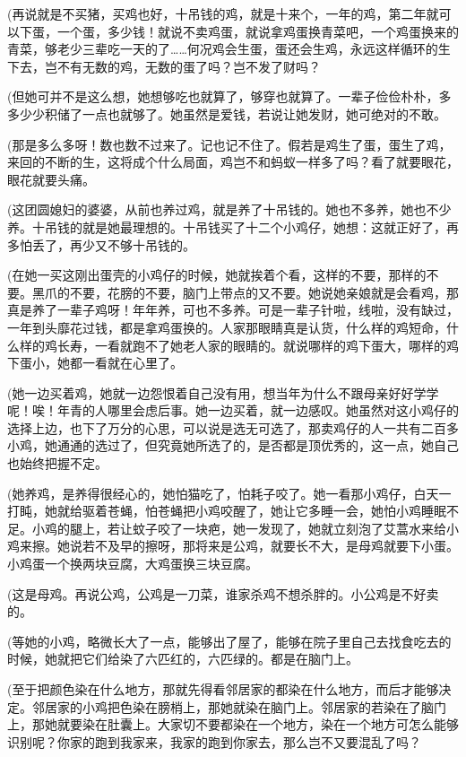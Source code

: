 \par (再说就是不买猪，买鸡也好，十吊钱的鸡，就是十来个，一年的鸡，第二年就可以下蛋，一个蛋，多少钱！就说不卖鸡蛋，就说拿鸡蛋换青菜吧，一个鸡蛋换来的青菜，够老少三辈吃一天的了……何况鸡会生蛋，蛋还会生鸡，永远这样循环的生下去，岂不有无数的鸡，无数的蛋了吗？岂不发了财吗？
\par (但她可并不是这么想，她想够吃也就算了，够穿也就算了。一辈子俭俭朴朴，多多少少积储了一点也就够了。她虽然是爱钱，若说让她发财，她可绝对的不敢。
\par (那是多么多呀！数也数不过来了。记也记不住了。假若是鸡生了蛋，蛋生了鸡，来回的不断的生，这将成个什么局面，鸡岂不和蚂蚁一样多了吗？看了就要眼花，眼花就要头痛。
\par (这团圆媳妇的婆婆，从前也养过鸡，就是养了十吊钱的。她也不多养，她也不少养。十吊钱的就是她最理想的。十吊钱买了十二个小鸡仔，她想：这就正好了，再多怕丢了，再少又不够十吊钱的。
\par (在她一买这刚出蛋壳的小鸡仔的时候，她就挨着个看，这样的不要，那样的不要。黑爪的不要，花膀的不要，脑门上带点的又不要。她说她亲娘就是会看鸡，那真是养了一辈子鸡呀！年年养，可也不多养。可是一辈子针啦，线啦，没有缺过，一年到头靡花过钱，都是拿鸡蛋换的。人家那眼睛真是认货，什么样的鸡短命，什么样的鸡长寿，一看就跑不了她老人家的眼睛的。就说哪样的鸡下蛋大，哪样的鸡下蛋小，她都一看就在心里了。
\par (她一边买着鸡，她就一边怨恨着自己没有用，想当年为什么不跟母亲好好学学呢！唉！年青的人哪里会虑后事。她一边买着，就一边感叹。她虽然对这小鸡仔的选择上边，也下了万分的心思，可以说是选无可选了，那卖鸡仔的人一共有二百多小鸡，她通通的选过了，但究竟她所选了的，是否都是顶优秀的，这一点，她自己也始终把握不定。
\par (她养鸡，是养得很经心的，她怕猫吃了，怕耗子咬了。她一看那小鸡仔，白天一打盹，她就给驱着苍蝇，怕苍蝇把小鸡咬醒了，她让它多睡一会，她怕小鸡睡眠不足。小鸡的腿上，若让蚊子咬了一块疤，她一发现了，她就立刻泡了艾蒿水来给小鸡来擦。她说若不及早的擦呀，那将来是公鸡，就要长不大，是母鸡就要下小蛋。小鸡蛋一个换两块豆腐，大鸡蛋换三块豆腐。
\par (这是母鸡。再说公鸡，公鸡是一刀菜，谁家杀鸡不想杀胖的。小公鸡是不好卖的。
\par (等她的小鸡，略微长大了一点，能够出了屋了，能够在院子里自己去找食吃去的时候，她就把它们给染了六匹红的，六匹绿的。都是在脑门上。
\par (至于把颜色染在什么地方，那就先得看邻居家的都染在什么地方，而后才能够决定。邻居家的小鸡把色染在膀梢上，那她就染在脑门上。邻居家的若染在了脑门上，那她就要染在肚囊上。大家切不要都染在一个地方，染在一个地方可怎么能够识别呢？你家的跑到我家来，我家的跑到你家去，那么岂不又要混乱了吗？
